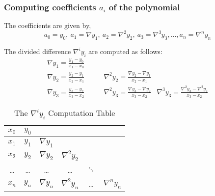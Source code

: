 \subsubsection{Computing coefficients $a_i$ of the polynomial}
The coefficients are given by,
\begin{equation}
	a_0 = y_0,\ a_1 = \nabla y_1,\ a_2 = \nabla^2 y_2,\ a_3 = \nabla^3 y_3,\dots, a_n = \nabla^n y_n
\end{equation}
\begin{remark}
	The divided difference $\nabla^i y_i$ are computed as follows:
	\begin{align*}
		\nabla y_1 = \frac{y_1 - y_0}{x_1 - x_0} & & \\
		\nabla y_2 = \frac{y_2 - y_1}{x_2 - x_1} &\qquad \nabla^2 y_2 = \frac{\nabla y_2 - \nabla y_1}{x_2-x_1} & \\
		\nabla y_3 = \frac{y_3 - y_2}{x_3 - x_2} &\qquad \nabla^2 y_3 = \frac{\nabla y_3 - \nabla y_2}{x_3-x_2} & \nabla^3 y_3 = \frac{\nabla^2 y_3 - \nabla^2 y_2}{x_3-x_2}
	\end{align*}
\end{remark}
\begin{table}[hb]
	\centering
	\begin{tabular}{|c||c|c|c|c|c|}
		\hline
		$x_0$ & $y_0$ & & & & \\ \hline
		$x_1$ & $y_1$ & $\nabla y_1$ & & &   \\ \hline
		$x_2$ & $y_2$ & $\nabla y_2$ & $\nabla^2 y_2$ & &   \\ \hline
		\dots & \dots & \dots & \dots & $\ddots$ & \\ \hline
		$x_n$ & $y_n$ & $\nabla y_n$ & $\nabla^2 y_n$ & \dots & $\nabla^n y_n$  \\ \hline
	\end{tabular}
	\caption{The $\nabla^i y_i$ Computation Table}
\end{table}


